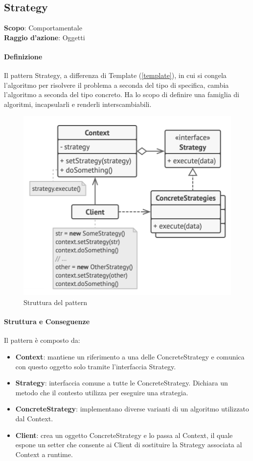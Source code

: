 \subsection{Strategy}
\label{strategy}

\textbf{Scopo}: Comportamentale \\
\textbf{Raggio d'azione}: Oggetti

\paragraph{Definizione} Il pattern Strategy, a differenza di Template (\ref{template}), in cui si congela l'algoritmo per risolvere il problema a seconda del tipo di specifica, cambia l'algoritmo a seconda del tipo concreto. Ha lo scopo di definire una famiglia di algoritmi, incapsularli e renderli interscambiabili.

\begin{figure}[H]
    \centering
    \includegraphics[width=0.5\linewidth]{assets/pattern/strategy/strategy-struttura.png}
    \caption{Struttura del pattern}
\end{figure}

\paragraph{Struttura e Conseguenze} Il pattern è composto da:
\begin{itemize}
    \item \textbf{Context}: mantiene un riferimento a una delle ConcreteStrategy e comunica con questo oggetto solo tramite l’interfaccia Strategy.
    \item \textbf{Strategy}: interfaccia comune a tutte le ConcreteStrategy. Dichiara un metodo che il contesto utilizza per eseguire una strategia.
    \item \textbf{ConcreteStrategy}: implementano diverse varianti di un algoritmo utilizzato dal Context.
    \item \textbf{Client}: crea un oggetto ConcreteStrategy e lo passa al Context, il quale espone un setter che consente ai Client di sostituire la Strategy associata al Context a runtime.
\end{itemize}

